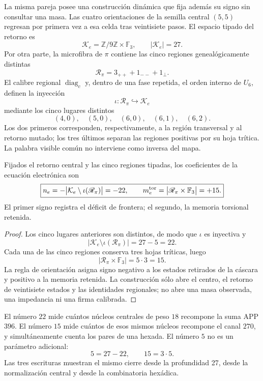 La misma pareja posee una construcción dinámica que fija además su signo sin
consultar una masa. Las cuatro orientaciones de la semilla central
\((5,5)\) regresan por primera vez a esa celda tras veintisiete pasos. El
espacio tipado del retorno es
\[
 \mathcal K_e=\mathbb Z/9\mathbb Z\times\mathbb F_3,
 \qquad |\mathcal K_e|=27.
\]
Por otra parte, la microfibra de \(\pi\) contiene las cinco regiones
genealógicamente distintas
\[
 \mathscr R_\pi=3_{++}+1_{--}+1_{\perp}.
\]
El calibre regional \(\operatorname{diag}_c\) y, dentro de una fase repetida,
el orden interno de \(U_6\), definen la inyección
\[
 \iota:\mathscr R_\pi\hookrightarrow\mathcal K_e
\]
mediante los cinco lugares distintos
\[
 (4,0),\quad(5,0),\quad(6,0),\quad(6,1),\quad(6,2).
\]
Los dos primeros corresponden, respectivamente, a la región transversal y
al retorno mutado; los tres últimos separan las regiones positivas por su
hoja trítica. La palabra visible común no interviene como inversa del mapa.

\begin{theorem}
\label{p12-83-c15-s2:thm:selector-persistencia-electron-rev7}
Fijados el retorno central y las cinco regiones tipadas, los coeficientes de
la ecuación electrónica son
\[
 \boxed{
 n_e=-\bigl|\mathcal K_e\setminus\iota(\mathscr R_\pi)\bigr|=-22,
 \qquad
 m_e^{\rm tor}=\bigl|\mathscr R_\pi\times\mathbb F_3\bigr|=+15.}
\]
El primer signo registra el déficit de frontera; el segundo, la memoria
torsional retenida.
\end{theorem}

\begin{proof}
Los cinco lugares anteriores son distintos, de modo que \(\iota\) es
inyectiva y
\[
 |\mathcal K_e\setminus\iota(\mathscr R_\pi)|=27-5=22.
\]
Cada una de las cinco regiones conserva tres hojas tríticas, luego
\[
 |\mathscr R_\pi\times\mathbb F_3|=5\cdot3=15.
\]
La regla de orientación asigna signo negativo a los estados retirados de la
cáscara y positivo a la memoria retenida. La construcción sólo abre el
centro, el retorno de veintisiete estados y las identidades regionales; no
abre una masa observada, una impedancia ni una firma calibrada.
\end{proof}

El número \(22\) mide cuántos núcleos centrales de peso \(18\) recompone la
suma APP \(396\). El número \(15\) mide cuántos de esos mismos núcleos
recompone el canal \(270\), y simultáneamente cuenta los pares de una
hexada. El número \(5\) no es un parámetro adicional:
\[
 5=27-22,\qquad 15=3\cdot5.
\]
Las tres escrituras muestran el mismo cierre desde la profundidad 27,
desde la normalización central y desde la combinatoria hexádica.

